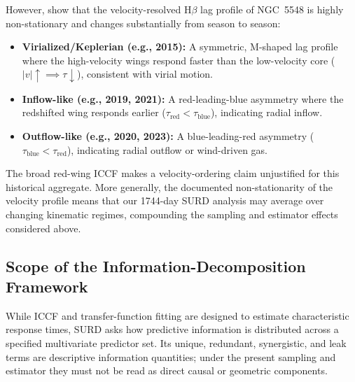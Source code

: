 \documentclass[fleqn,usenatbib]{mnras}
\begin{document}
However, \citet{Xi2025} show that the velocity-resolved H\(\beta\) lag profile of NGC~5548 is highly non-stationary and changes substantially from season to season:
\begin{itemize}
    \item \textbf{Virialized/Keplerian (e.g., 2015):} A symmetric, M-shaped lag profile where the high-velocity wings respond faster than the low-velocity core ($|v| \uparrow \implies \tau \downarrow$), consistent with virial motion.
    \item \textbf{Inflow-like (e.g., 2019, 2021):} A red-leading-blue asymmetry where the redshifted wing responds earlier ($\tau_{\mathrm{red}} < \tau_{\mathrm{blue}}$), indicating radial inflow.
    \item \textbf{Outflow-like (e.g., 2020, 2023):} A blue-leading-red asymmetry ($\tau_{\mathrm{blue}} < \tau_{\mathrm{red}}$), indicating radial outflow or wind-driven gas.
\end{itemize}
The broad red-wing ICCF makes a velocity-ordering claim unjustified for this historical aggregate. More generally, the documented non-stationarity of the velocity profile means that our 1744-day SURD analysis may average over changing kinematic regimes, compounding the sampling and estimator effects considered above.

\subsection{Scope of the Information-Decomposition Framework}
\label{sec:novelty_framework}

While ICCF and transfer-function fitting are designed to estimate characteristic response times, SURD asks how predictive information is distributed across a specified multivariate predictor set. Its unique, redundant, synergistic, and leak terms are descriptive information quantities; under the present sampling and estimator they must not be read as direct causal or geometric components.
\end{document}
